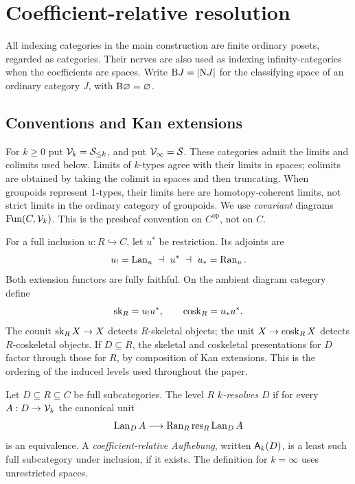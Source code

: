 \section{Coefficient-relative resolution}
\label{sec:setup}

All indexing categories in the main construction are finite ordinary posets,
regarded as categories. Their nerves are also used as indexing
infinity-categories when the coefficients are spaces. Write $\mathrm B J=|\mathrm N J|$
for the classifying space of an ordinary category $J$, with
$\mathrm B\varnothing=\varnothing$.

\subsection{Conventions and Kan extensions}

For $k\geq0$ put $\mathcal V_k=\mathcal S_{\leq k}$, and put
$\mathcal V_\infty=\mathcal S$. These categories admit the limits and colimits
used below. Limits of $k$-types agree with their limits in spaces; colimits
are obtained by taking the colimit in spaces and then truncating. When
groupoids represent 1-types, their limits here are homotopy-coherent
limits, not strict limits in the ordinary category of groupoids. We use
\emph{covariant} diagrams $\operatorname{Fun}(C,\mathcal V_k)$. This is the presheaf convention
on $C^{\mathrm{op}}$, not on $C$.

For a full inclusion $u:R\hookrightarrow C$, let $u^*$ be restriction. Its
adjoints are
\begin{equation}\label{eq:triple}
u_!=\operatorname{Lan}_u\ \dashv\ u^*\ \dashv\ u_*=\operatorname{Ran}_u.
\end{equation}
Both extension functors are fully faithful. On the ambient diagram category
define
\[
\operatorname{sk}_R=u_!u^*,\qquad \operatorname{cosk}_R=u_*u^*.
\]
The counit $\operatorname{sk}_R X\to X$ detects $R$-skeletal objects; the unit
$X\to\operatorname{cosk}_R X$ detects $R$-coskeletal objects. If $D\subseteq R$, the
skeletal and coskeletal presentations for $D$ factor through those for $R$,
by composition of Kan extensions. This is the ordering of the induced levels
used throughout the paper.

\begin{definition}\label{def:resolution}
Let $D\subseteq R\subseteq C$ be full subcategories. The level $R$
\emph{$k$-resolves $D$} if for every $A:D\to\mathcal V_k$ the canonical unit
\begin{equation}\label{eq:resolution}
\operatorname{Lan}_D A\longrightarrow \operatorname{Ran}_R\operatorname{res}_R\operatorname{Lan}_D A
\end{equation}
is an equivalence. A \emph{coefficient-relative Aufhebung}, written
$\mathsf A_k(D)$, is a least such full subcategory under inclusion, if it exists.
The definition for $k=\infty$ uses unrestricted spaces.
\end{definition}

